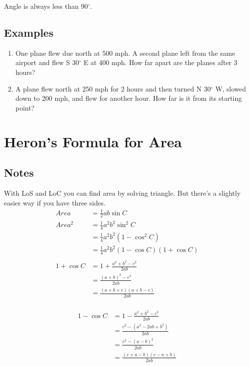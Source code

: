 \documentclass{exam}
\newcommand{\dg}{\ensuremath{^\circ}}
\begin{document}
  Angle is always less than $90 \dg$.

  \subsection{Examples}
  \begin{enumerate}
    \item One plane flew due north at 500 mph.  A second plane left from the same airport and flew S $30 \dg$ E at 400
      mph.  How far apart are the planes after 3 hours?

    \item A plane flew north at 250 mph for 2 hours and then turned N $30 \dg$ W, slowed down to 200 mph, and flew for
      another hour.  How far is it from its starting point?

  \end{enumerate}

  \section{Heron's Formula for Area}

  \subsection{Notes}
  With LoS and LoC you can find area by solving triangle.  But there's a slightly easier way if you have three sides.
  \begin{align*}
    Area   & = \frac{1}{2} a b \sin C \\
    Area^2 & = \frac{1}{4} a^2 b^2 \sin^2 C \\
           & = \frac{1}{4} a^2 b^2 \left( 1 - \cos^2 C \right) \\
           & = \frac{1}{4} a^2 b^2 ( 1 - \cos C )( 1 + \cos C ) \\
    \\
    1 + \cos C & = 1 + \frac{a^2 + b^2 - c^2}{2ab} \\
               & = \frac{(a + b)^2 - c^2}{2ab} \\
               & = \frac{(a + b + c)(a + b - c)}{2ab} \\
   \end{align*}

  \begin{align*}
    1 - \cos C & = 1 - \frac{a^2 + b^2 - c^2}{2ab} \\
               & = \frac{c^2 - (a^2 - 2ab + b^2)}{2ab} \\
               & = \frac{c^2 - (a - b)^2 }{2ab} \\
               & = \frac{(c + a - b)(c - a + b)}{2ab} \\
   \end{align*}
\end{document}

